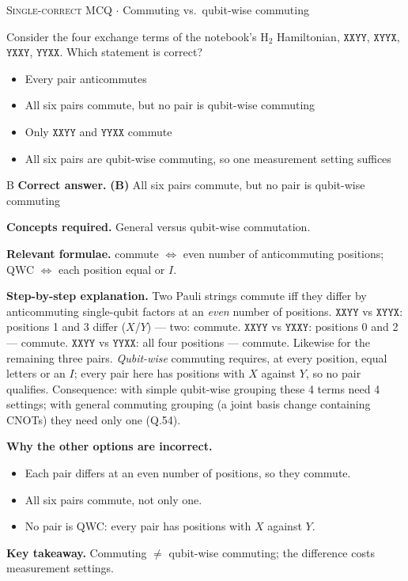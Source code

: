 \documentclass[11pt,a4paper]{article}
\newcommand{\optlabel}[1]{\textbf{(#1)}}
\newcommand{\correctlabel}[1]{\textcolor{okgreen}{\textbf{(#1)}\,\ding{51}}}
\newenvironment{qitem}[1]{\begin{list}{}{\setlength{\leftmargin}{3.3em}\setlength{\labelwidth}{3.1em}%
  \setlength{\labelsep}{0.2em}\setlength{\topsep}{3pt}\setlength{\parsep}{3pt}}\item[\textbf{Q.#1}\hfill]}{\end{list}}
\newcommand{\qsep}{\par\vspace{2pt}{\color{black!15}\hrule}\vspace{4pt}}
\newcommand{\qmeta}[2]{{\footnotesize\color{black!60}\textsc{#1} \;$\cdot$\; #2}\par}
\begin{document}
\begin{qitem}{29}
\qmeta{Single-correct MCQ}{Commuting vs.\ qubit-wise commuting}
Consider the four exchange terms of the notebook's H$_2$ Hamiltonian, $\texttt{XXYY}$, $\texttt{XYYX}$, $\texttt{YXXY}$, $\texttt{YYXX}$. Which statement is
correct?
\begin{itemize}[leftmargin=2.6em, labelsep=0.4em, itemsep=2pt, topsep=3pt]
\item[\optlabel{A}] Every pair anticommutes
\item[\correctlabel{B}] All six pairs commute, but no pair is qubit-wise commuting
\item[\optlabel{C}] Only $\texttt{XXYY}$ and $\texttt{YYXX}$ commute
\item[\optlabel{D}] All six pairs are qubit-wise commuting, so one measurement setting suffices
\end{itemize}
\end{qitem}
\begin{solbox}{B}
\textbf{\color{brand}Correct answer.} \textcolor{okgreen}{\textbf{(B)}} All six pairs commute, but no pair is qubit-wise commuting

\textbf{\color{brand}Concepts required.} General versus qubit-wise commutation.

\textbf{\color{brand}Relevant formulae.} commute $\iff$ even number of anticommuting positions; QWC $\iff$ each position equal or $I$.

\textbf{\color{brand}Step-by-step explanation.} Two Pauli strings commute iff they differ by anticommuting single-qubit factors at an \emph{even} number of positions.
$\texttt{XXYY}$ vs $\texttt{XYYX}$: positions 1 and 3 differ ($X$/$Y$) --- two: commute. $\texttt{XXYY}$ vs $\texttt{YXXY}$: positions 0 and 2 --- commute.
$\texttt{XXYY}$ vs $\texttt{YYXX}$: all four positions --- commute. Likewise for the remaining three pairs.
\emph{Qubit-wise} commuting requires, at every position, equal letters or an $I$; every pair here has positions with $X$ against $Y$, so
no pair qualifies. Consequence: with simple qubit-wise grouping these 4 terms need 4 settings; with general commuting grouping (a
joint basis change containing CNOTs) they need only one (Q.54).

\textbf{\color{brand}Why the other options are incorrect.}
\begin{itemize}[leftmargin=2.4em, itemsep=1pt, topsep=2pt]
\item[\textbf{(A)}] Each pair differs at an even number of positions, so they commute.
\item[\textbf{(C)}] All six pairs commute, not only one.
\item[\textbf{(D)}] No pair is QWC: every pair has positions with $X$ against $Y$.
\end{itemize}
\textbf{\color{brand}Key takeaway.} Commuting $\ne$ qubit-wise commuting; the difference costs measurement settings.
\end{solbox}
\qsep
\end{document}
